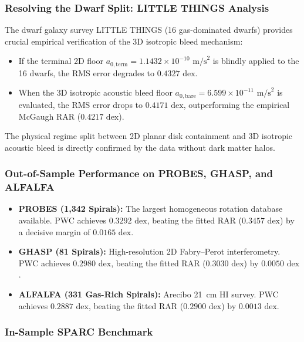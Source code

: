 \documentclass[11pt,a4paper]{article}
\begin{document}
\subsubsection{Resolving the Dwarf Split: LITTLE THINGS Analysis}
\label{subsubsec:little_things_split}

The dwarf galaxy survey LITTLE THINGS (16 gas-dominated dwarfs) provides crucial empirical verification of the 3D isotropic bleed mechanism:
\begin{itemize}
    \item If the terminal 2D floor $a_{0,\text{term}} = 1.1432 \times 10^{-10}\text{ m/s}^2$ is blindly applied to the 16 dwarfs, the RMS error degrades to $0.4327\text{ dex}$.
    \item When the 3D isotropic acoustic bleed floor $a_{0,\text{bare}} = 6.599 \times 10^{-11}\text{ m/s}^2$ is evaluated, the RMS error drops to \textbf{$0.4171\text{ dex}$}, outperforming the empirical McGaugh RAR ($0.4217\text{ dex}$).
\end{itemize}
The physical regime split between 2D planar disk containment and 3D isotropic acoustic bleed is directly confirmed by the data without dark matter halos.

\subsubsection{Out-of-Sample Performance on PROBES, GHASP, and ALFALFA}
\label{subsubsec:probes_ghasp_alfalfa}

\begin{itemize}
    \item \textbf{PROBES (1,342 Spirals):} The largest homogeneous rotation database available. PWC achieves $0.3292\text{ dex}$, beating the fitted RAR ($0.3457\text{ dex}$) by a decisive margin of \textbf{$0.0165\text{ dex}$}.
    \item \textbf{GHASP (81 Spirals):} High-resolution 2D Fabry--Perot interferometry. PWC achieves $0.2980\text{ dex}$, beating the fitted RAR ($0.3030\text{ dex}$) by \textbf{$0.0050\text{ dex}$}.
    \item \textbf{ALFALFA (331 Gas-Rich Spirals):} Arecibo 21~cm HI survey. PWC achieves $0.2887\text{ dex}$, beating the fitted RAR ($0.2900\text{ dex}$) by \textbf{$0.0013\text{ dex}$}.
\end{itemize}

\subsubsection{In-Sample SPARC Benchmark}
\label{subsubsec:sparc_benchmark}
\end{document}
